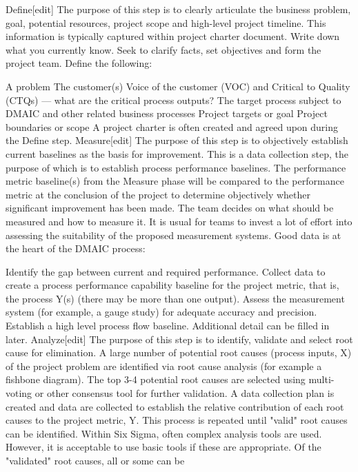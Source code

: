Define[edit]
The purpose of this step is to clearly articulate the business problem, goal, potential resources, project scope and high-level project timeline. This information is typically captured within project charter document. Write down what you currently know. Seek to clarify facts, set objectives and form the project team. Define the following:

A problem
The customer(s)
Voice of the customer (VOC) and Critical to Quality (CTQs) — what are the critical process outputs?
The target process subject to DMAIC and other related business processes
Project targets or goal
Project boundaries or scope
A project charter is often created and agreed upon during the Define step.
Measure[edit]
The purpose of this step is to objectively establish current baselines as the basis for improvement. This is a data collection step, the purpose of which is to establish process performance baselines. The performance metric baseline(s) from the Measure phase will be compared to the performance metric at the conclusion of the project to determine objectively whether significant improvement has been made. The team decides on what should be measured and how to measure it. It is usual for teams to invest a lot of effort into assessing the suitability of the proposed measurement systems. Good data is at the heart of the DMAIC process:

Identify the gap between current and required performance.
Collect data to create a process performance capability baseline for the project metric, that is, the process Y(s) (there may be more than one output).
Assess the measurement system (for example, a gauge study) for adequate accuracy and precision.
Establish a high level process flow baseline. Additional detail can be filled in later.
Analyze[edit]
The purpose of this step is to identify, validate and select root cause for elimination. A large number of potential root causes (process inputs, X) of the project problem are identified via root cause analysis (for example a fishbone diagram). The top 3-4 potential root causes are selected using multi-voting or other consensus tool for further validation. A data collection plan is created and data are collected to establish the relative contribution of each root causes to the project metric, Y. This process is repeated until "valid" root causes can be identified. Within Six Sigma, often complex analysis tools are used. However, it is acceptable to use basic tools if these are appropriate. Of the "validated" root causes, all or some can be

